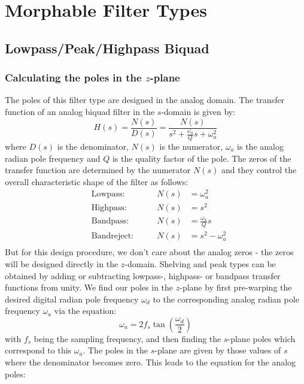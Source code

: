 \section{Morphable Filter Types}

\subsection{Lowpass/Peak/Highpass Biquad}
\subsubsection{Calculating the poles in the $z$-plane}
The poles of this filter type are designed in the analog domain. The transfer function of an analog biquad filter in the $s$-domain is given by:
\begin{equation}
 H(s) = \frac{N(s)}{D(s)} = \frac{N(s)}{s^2 + \frac{\omega_a}{Q}s + \omega_a^2}
\end{equation}
where $D(s)$ is the denominator, $N(s)$ is the numerator, $\omega_a$ is the analog radian pole frequency and $Q$ is the quality factor of the pole. The zeros of the transfer function are determined by the numerator $N(s)$ and they control the overall characteristic shape of the filter as follows:
\begin{equation}
\begin{aligned}
 &\text{Lowpass:}    \qquad &N(s) &= \omega_a^2                \\
 &\text{Highpass:}   \qquad &N(s) &= s^2                       \\
 &\text{Bandpass:}   \qquad &N(s) &= \frac{\omega_a}{Q}s       \\ 
 &\text{Bandreject:} \qquad &N(s) &= s^2 - \omega_a^2          \\  
\end{aligned}
\end{equation}
But for this design procedure, we don't care about the analog zeros - the zeros will be designed directly in the $z$-domain. Shelving and peak types can be obtained by adding or subtracting lowpass-, highpass- or bandpass transfer functions from unity. We find our poles in the $z$-plane by first pre-warping the desired digital radian pole frequency $\omega_d$ to the corresponding analog radian pole frequency $\omega_a$ via the equation:
\begin{equation}
 \omega_a = 2 f_s \tan \left( \frac{\omega_d}{2} \right)
\end{equation}
with $f_s$ being the sampling frequency, and then finding the $s$-plane poles which correspond to this $\omega_a$. The poles in the $s$-plane are given by those values of $s$ where the denominator becomes zero. This leads to the equation for the analog poles:
